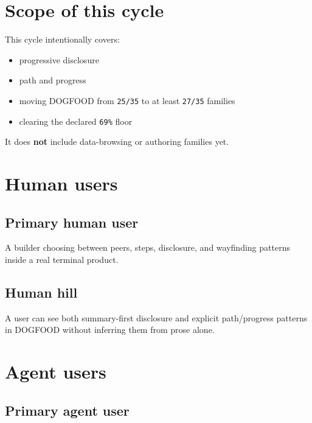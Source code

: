 \section{Scope of this cycle}\label{record-077-scope-of-this-cycle}

This cycle intentionally covers:

\begin{itemize}
\tightlist
\item
  progressive disclosure
\item
  path and progress
\item
  moving DOGFOOD from \texttt{2\allowbreak{}5\allowbreak{}/\allowbreak{}3\allowbreak{}5} to at least \texttt{2\allowbreak{}7\allowbreak{}/\allowbreak{}3\allowbreak{}5} families
\item
  clearing the declared \texttt{6\allowbreak{}9\allowbreak{}\%} floor
\end{itemize}

It does \textbf{not} include data-browsing or authoring families yet.

\section{Human users}\label{record-077-human-users}

\subsection{Primary human user}\label{record-077-primary-human-user}

A builder choosing between peers, steps, disclosure, and wayfinding patterns inside a real terminal product.

\subsection{Human hill}\label{record-077-human-hill}

A user can see both summary-first disclosure and explicit path/progress patterns in DOGFOOD without inferring them from prose alone.

\section{Agent users}\label{record-077-agent-users}

\subsection{Primary agent user}\label{record-077-primary-agent-user}

